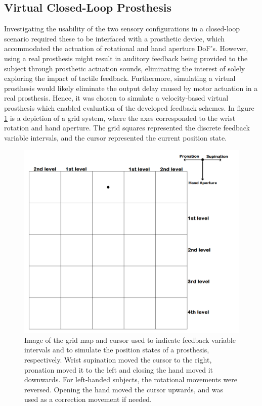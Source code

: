 
\subsection{Virtual Closed-Loop Prosthesis}
 
Investigating the usability of the two sensory configurations in a closed-loop scenario required these to be interfaced with a prosthetic device, which accommodated the actuation of rotational and hand aperture DoF's. However, using a real prosthesis might result in auditory feedback being provided to the subject through prosthetic actuation sounds, eliminating the interest of solely exploring the impact of tactile feedback. Furthermore, simulating a virtual prosthesis would likely eliminate the output delay caused by motor actuation in a real prosthesis. Hence, it was chosen to simulate a velocity-based virtual prosthesis which enabled evaluation of the developed feedback schemes. In figure \ref{fig:pa:gridmap} is a depiction of a grid system, where the axes corresponded to the wrist rotation and hand aperture. The grid squares represented the discrete feedback variable intervals, and the cursor represented the current position state.  
\begin{figure}[H]                 
	\includegraphics[width=1\textwidth]{figures/gridmap2}  
	\caption{Image of the grid map and cursor used to indicate feedback variable intervals and to simulate the position states of a prosthesis, respectively. Wrist supination moved the cursor to the right, pronation moved it to the left and closing the hand moved it downwards. For left-handed subjects, the rotational movements were reversed. Opening the hand moved the cursor upwards, and was used as a correction movement if needed.}
	\label{fig:pa:gridmap} 
\end{figure}
